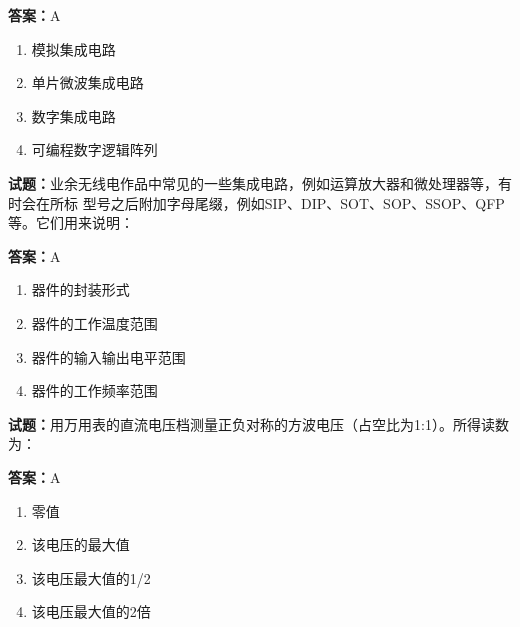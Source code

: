\documentclass{ctexbook}
\begin{document}
\textbf{答案：}A 

\begin{enumerate}[leftmargin=3em]
  \item 模拟集成电路 

  \item 单片微波集成电路 

  \item 数字集成电路 

  \item 可编程数字逻辑阵列 

\end{enumerate}





\vspace{1em}

\textbf{试题：}业余无线电作品中常见的一些集成电路，例如运算放大器和微处理器等，有时会在所标
型号之后附加字母尾缀，例如SIP、DIP、SOT、SOP、SSOP、QFP等。它们用来说明： 

\textbf{答案：}A 

\begin{enumerate}[leftmargin=3em]
  \item 器件的封装形式 

  \item 器件的工作温度范围 

  \item 器件的输入输出电平范围 

  \item 器件的工作频率范围 

\end{enumerate}





\vspace{1em}

\textbf{试题：}用万用表的直流电压档测量正负对称的方波电压（占空比为1:1）。所得读数为： 

\textbf{答案：}A 

\begin{enumerate}[leftmargin=3em]
  \item 零值 

  \item 该电压的最大值 

  \item 该电压最大值的1/2 

  \item 该电压最大值的2倍 

\end{enumerate}
\end{document}
